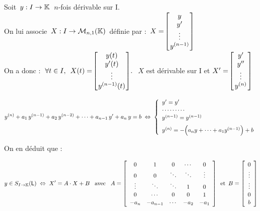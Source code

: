 \vspace{0.7cm}

Soit \(\,y:I\to \mathbb{K}\:\) $n$-fois dérivable sur I.\vspace{-0.3cm}\\
On lui associe \(\,X:I\to \mathcal{M}_{n,1}(\mathbb{K})\,\) définie par : \(\, X=\!\arraycolsep=0.03cm\def\arraystretch{1}\left[
\begin{array}{c}
    y\\
    y'\\
    \vdots\\
    y^{(n-1)}
\end{array}
\right]\)\\
On a donc : \(\;\forall t\in I,\ \,X(t)=\!\arraycolsep=0.03cm\def\arraystretch{1}\left[
    \begin{array}{c}
        y(t)\\
        y'(t)\\
        \vdots\\
        y^{(n-1)}(t)
    \end{array}
    \right]\!.\ \) $X$ est dérivable sur I et \(  X'=\!\arraycolsep=0.05cm\def\arraystretch{1}\left[
        \begin{array}{c}
            y'\\
            y''\\
            \vdots\\
            y^{(n)}
        \end{array}
        \right]\)

\vspace{0.5cm}

\[y^{(n)}+a_1\,y^{(n-1)}+a_2\,y^{(n-2)}+\cdots+a_{n-1}\,y'+a_n\,y=b\; \Leftrightarrow\; \left\{\def\arraystretch{1.1}
\begin{array}{l}
    y'=y'\\
    \cdots\cdots\cdots\\
    y^{(n-1)}=y^{(n-1)}\vspace{0.2cm}\\
    y^{(n)}=-\Bigl(a_ny+\cdots+a_1y^{(n-1)}\Bigr)+b
\end{array}
 \right.\]\vspace{0.5cm}

On en déduit que : \vspace{-1cm}

\[y\in S_{I\to \KK}(\mathsf{L})\;\Leftrightarrow \; X'=A\cdot X+B \quad\! \text{avec}\quad\!  A=\left[
\begin{array}{ccccc}
    0 & 1 & 0 & \cdots & 0\\
    0 & 0 & \ddots & \ddots & \vdots \\
    \vdots & \ddots & \ddots & 1 & 0 \\
    0 & \cdots & 0 & 0 & 1 \\
    -a_n & -a_{n-1} & \cdots & -a_2 & -a_1 
\end{array}
\right]\, \text{ et }\, B=\left[
\begin{array}{c}
    0\\
    \vdots\\
    \vdots\\
    0\\
    b   
\end{array}
\right]\]

